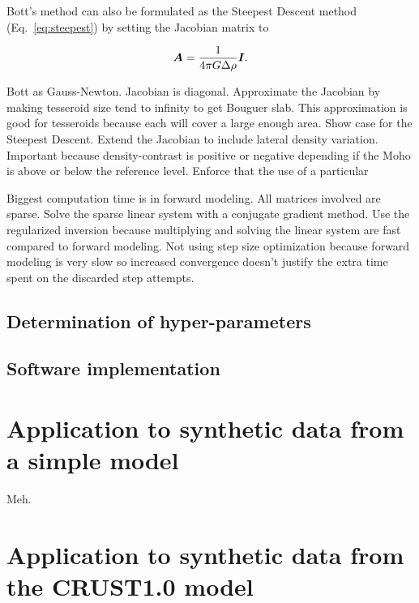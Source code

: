 \documentclass[extra]{gji}
\newcommand{\eq}[1]{Eq.~\ref{eq:#1}}
\newcommand{\mbf}[1]{\hbox{\mathversion{bold}$#1$}}
\begin{document}
Bott's method can also be formulated as the Steepest Descent method
(\eq{steepest}) by setting the Jacobian matrix to

\begin{equation}
    \mbf{A} = \dfrac{1}{4 \pi G \Delta \rho}\mbf{I}.
    \label{eq:bott-steepest}
\end{equation}


Bott as Gauss-Newton.
Jacobian is diagonal.
Approximate the Jacobian by making tesseroid size tend to infinity to get
Bouguer slab.
This approximation is good for tesseroids because each will cover a large
enough area.
Show case for the Steepest Descent.
Extend the Jacobian to include lateral density variation.
Important because density-contrast is positive or negative depending if the
Moho is above or below the reference level.
Enforce that the use of a particular

Biggest computation time is in forward modeling.
All matrices involved are sparse.
Solve the sparse linear system with a conjugate gradient method.
Use the regularized inversion because multiplying and solving the linear system
are fast compared to forward modeling.
Not using step size optimization because forward modeling is very slow so
increased convergence doesn't justify the extra time spent on the discarded
step attempts.

\subsection{Determination of hyper-parameters}



\subsection{Software implementation}



\section{Application to synthetic data from a simple model}


Meh.


\section{Application to synthetic data from the CRUST1.0 model}
\end{document}
